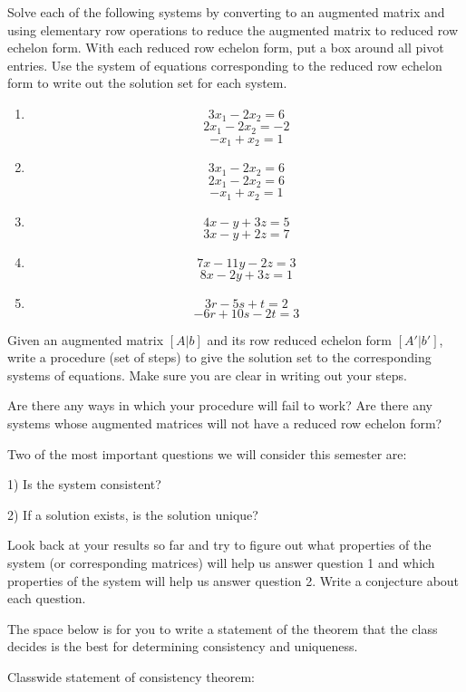 \begin{question}\label{q3} Solve each of the following systems by converting to an augmented matrix and using elementary row operations to reduce the augmented matrix to reduced row echelon form. With each reduced row echelon form, put a box around all pivot entries. Use the system of equations corresponding to the reduced row echelon form to write out the solution set for each system.
\begin{enumerate}
\item  $$ 3x_1-2x_2=6$$
$$ 2x_1-2x_2=-2 $$
$$-x_1+x_2=1 $$
\item  $$ 3x_1-2x_2=6$$
$$ 2x_1-2x_2=6 $$
$$-x_1+x_2=1 $$
\item  $$4x-y+3z=5$$
$$3x-y+2z=7$$
\item  $$7x-11y-2z=3$$
$$8x-2y+3z=1$$
\item  $$3r-5s+t=2$$
$$-6r+10s-2t=3$$
\end{enumerate}
\end{question}
\begin{question}
Given an augmented matrix $[A|b]$ and its row reduced echelon form $[A'|b']$, write a procedure (set of steps) to give the solution set to the corresponding systems of equations. Make sure you are clear in writing out your steps.

Are there any ways in which your procedure will fail to work? Are there any systems whose augmented matrices will not have a reduced row echelon form?
\end{question}



Two of the most important questions we will consider this semester are:

1) Is the system consistent?

2) If a solution exists, is the solution unique?

\begin{question} Look back at your results so far and try to figure out what properties of the system (or corresponding matrices) will help us answer question 1 and which properties of the system will help us answer question 2. Write a conjecture about each question. \end{question}

The space below is for you to write a statement of the theorem that the class decides is the best for determining consistency and uniqueness.
\begin{theorem}
Classwide statement of consistency theorem:
\vspace{2.5in}

\end{theorem}

